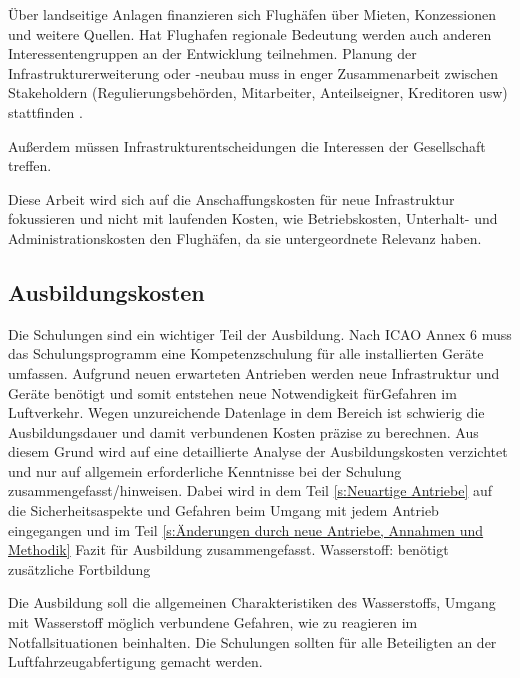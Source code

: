 Über landseitige Anlagen finanzieren sich Flughäfen über Mieten, Konzessionen und weitere Quellen. %
Hat Flughafen regionale Bedeutung werden auch anderen Interessentengruppen an der Entwicklung teilnehmen.
Planung der Infrastrukturerweiterung oder -neubau muss in enger Zusammenarbeit 
zwischen Stakeholdern (Regulierungsbehörden, Mitarbeiter, Anteilseigner, Kreditoren usw) stattfinden \cite{wittmer2011aviation}.

Außerdem müssen Infrastrukturentscheidungen die Interessen der Gesellschaft treffen. %

Diese Arbeit wird sich auf die Anschaffungskosten für neue Infrastruktur fokussieren und nicht mit 
laufenden Kosten, wie Betriebskosten, Unterhalt- und Administrationskosten den Flughäfen, da sie untergeordnete Relevanz haben.

\subsection{Ausbildungskosten}

Die Schulungen sind ein wichtiger Teil der Ausbildung. 
Nach ICAO Annex 6 muss das Schulungsprogramm eine Kompetenzschulung für alle installierten Geräte umfassen.
Aufgrund neuen erwarteten Antrieben werden neue Infrastruktur und Geräte benötigt und somit entstehen neue Notwendigkeit fürGefahren im Luftverkehr. 
%
Wegen unzureichende Datenlage in dem Bereich ist schwierig die Ausbildungsdauer und damit verbundenen Kosten präzise zu berechnen.
Aus diesem Grund wird auf eine detaillierte Analyse der Ausbildungskosten verzichtet und nur auf allgemein erforderliche Kenntnisse bei
der Schulung zusammengefasst/hinweisen. Dabei wird in dem Teil \ref{s:Neuartige Antriebe} auf die Sicherheitsaspekte und Gefahren 
beim Umgang mit jedem Antrieb eingegangen und im Teil 
\ref{s:Änderungen durch neue Antriebe, Annahmen und Methodik} Fazit für Ausbildung zusammengefasst. %
Wasserstoff: benötigt zusätzliche Fortbildung 

Die Ausbildung soll die allgemeinen Charakteristiken des Wasserstoffs, Umgang mit Wasserstoff möglich verbundene Gefahren, wie zu reagieren im Notfallsituationen
beinhalten. %
Die Schulungen sollten für alle Beteiligten an der Luftfahrzeugabfertigung gemacht werden.
